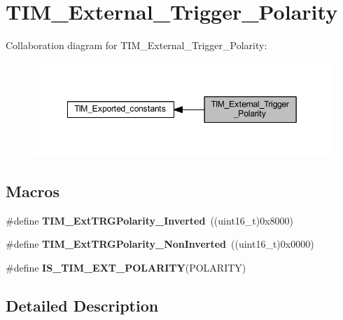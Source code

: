 \hypertarget{group___t_i_m___external___trigger___polarity}{}\section{T\+I\+M\+\_\+\+External\+\_\+\+Trigger\+\_\+\+Polarity}
\label{group___t_i_m___external___trigger___polarity}
Collaboration diagram for T\+I\+M\+\_\+\+External\+\_\+\+Trigger\+\_\+\+Polarity\+:\nopagebreak
\begin{figure}[H]
\begin{center}
\leavevmode
\includegraphics[width=349pt]{group___t_i_m___external___trigger___polarity}
\end{center}
\end{figure}
\subsection*{Macros}
\begin{DoxyCompactItemize}
\item 
\mbox{\label{group___t_i_m___external___trigger___polarity_ga96f3959a02c0491ab8d65cfa384ce7e3}} 
\#define {\bfseries T\+I\+M\+\_\+\+Ext\+T\+R\+G\+Polarity\+\_\+\+Inverted}~((uint16\+\_\+t)0x8000)
\item 
\mbox{\label{group___t_i_m___external___trigger___polarity_ga63fe7c58c491d2a812d5621b71c2d0c5}} 
\#define {\bfseries T\+I\+M\+\_\+\+Ext\+T\+R\+G\+Polarity\+\_\+\+Non\+Inverted}~((uint16\+\_\+t)0x0000)
\item 
\#define {\bfseries I\+S\+\_\+\+T\+I\+M\+\_\+\+E\+X\+T\+\_\+\+P\+O\+L\+A\+R\+I\+TY}(P\+O\+L\+A\+R\+I\+TY)
\end{DoxyCompactItemize}


\subsection{Detailed Description}



